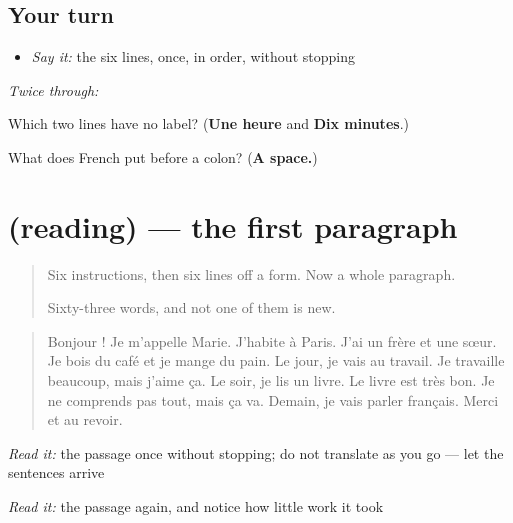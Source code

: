\subsection*{Your turn}
\begin{itemize}
\raggedright
  \item \emph{Say it:} the six lines, once, in order, without stopping
\end{itemize}

\emph{Twice through:}

\begin{tcolorbox}[breakable,colback=teal!4,colframe=teal!35!black,title={Before you move on}]
Which two lines have no label? (\textbf{Une heure} and \textbf{Dix minutes}.)

What does French put before a colon? (\textbf{A space.})
\end{tcolorbox}
\section[(reading)]{(reading) — the first paragraph}

\label{lesson:FR-C45-premiere-lecture}



\begin{quote}
Six instructions, then six lines off a form. Now a whole paragraph.

Sixty-three words, and not one of them is new.
\end{quote}

\begin{tcolorbox}[breakable,skin=enhanced,colback=orange!6,colframe=orange!45!black,boxrule=0.5pt,arc=1mm,left=6pt,right=6pt,top=4pt,bottom=4pt,fonttitle=\bfseries,title={Read this}]
\begin{quote}
Bonjour ! Je m'appelle Marie. J'habite à Paris. J'ai un frère et une sœur. Je bois du café et je mange du pain. Le jour, je vais au travail. Je travaille beaucoup, mais j'aime ça. Le soir, je lis un livre. Le livre est très bon. Je ne comprends pas tout, mais ça va. Demain, je vais parler français. Merci et au revoir.
\end{quote}

\emph{Read it:} the passage once without stopping; do not translate as you go — let the sentences arrive

\emph{Read it:} the passage again, and notice how little work it took
\end{tcolorbox}

